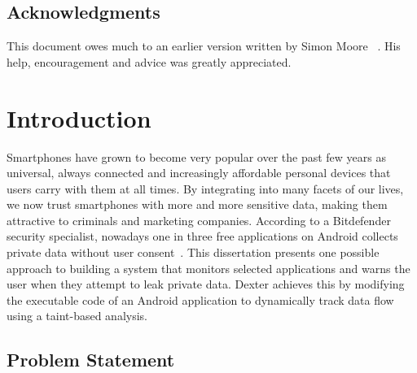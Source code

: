 \documentclass[12pt,twoside,notitlepage]{report}
\begin{document}
\cleardoublepage

\tableofcontents

\newpage
\section*{Acknowledgments}

This document owes much to an earlier version written by Simon Moore
~\cite{moore95}.  His help, encouragement and advice was greatly 
appreciated.


\cleardoublepage        %

\setcounter{page}{1}
\pagestyle{headings}

\chapter{Introduction}

Smartphones have grown to become very popular over the past few years as universal, always connected and increasingly affordable personal devices that users carry with them at all times. By integrating into many facets of our lives, we now trust smartphones with more and more sensitive data, making them attractive to criminals and marketing companies. According to a Bitdefender security specialist, nowadays one in three free applications on Android collects private data without user consent~\cite{web:HuffingtonOneInThree}. This dissertation presents one possible approach to building a system that monitors selected applications and warns the user when they attempt to leak private data. Dexter achieves this by modifying the executable code of an Android application to dynamically track data flow using a taint-based analysis.

\section{Problem Statement}
\end{document}
